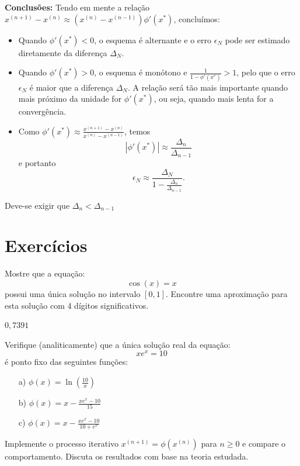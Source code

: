 \documentclass[main.tex]{subfiles}
\begin{document}
{\bf Conclusões:} Tendo em mente a relação $x^{(n+1)}-x^{(n)}  \approx (x^{(n)}-x^{(n-1)}) \phi'(x^*)$, concluímos:
\begin{itemize}
\item Quando $\phi'(x^*)<0$, o esquema é alternante e o erro $\epsilon_N$ pode ser estimado diretamente da diferença $\Delta_N$.
\item Quando $\phi'(x^*)>0$, o esquema é monótono e $\frac{1}{1-\phi'(x^*)}>1$, pelo que o erro $\epsilon_N$ é maior que a diferença $\Delta_N$. A relação será tão mais importante quando mais próximo da unidade for $\phi'(x^*)$, ou seja, quando mais lenta for a convergência.
\item Como $\phi'(x^*)\approx \frac{x^{(n+1)}-x^{(n)}}{x^{(n)}-x^{(n-1)}}$, temos
$$\left|\phi'(x^*)\right|\approx \frac{\Delta_n}{\Delta_{n-1}}$$
e portanto
$$\epsilon_N \approx \frac{\Delta_N}{1-\frac{\Delta_n}{\Delta_{n-1}}}.$$
\end{itemize}

\begin{obs}
  Deve-se exigir que $\Delta_n<\Delta_{n-1}$
\end{obs}

\section*{Exercícios}

\begin{Exercise}  Mostre que a equação:
  \begin{equation*}
    \cos(x)=x  
  \end{equation*}
possui uma única solução no intervalo $[0, 1]$. Encontre uma aproximação para esta solução com  4 dígitos significativos.
\end{Exercise}
\begin{Answer}
  \begin{tiny}
    $0,7391$
  \end{tiny}
\end{Answer}

\begin{Exercise} Verifique (analiticamente) que a única solução real da equação:
  \begin{equation*}
    xe^x=10
  \end{equation*}
é ponto fixo das seguintes funções:
\begin{itemize}
\item[a)] $\phi(x)=\ln\left(\frac{10}{x}\right)$
\item[b)] $\phi(x)=x-\frac{xe^{x}-10}{15}$
\item[c)] $\phi(x)=x-\frac{xe^{x}-10}{10+e^{x}}$
\end{itemize}
Implemente o processo iterativo $x^{(n+1)}=\phi(x^{(n)})$ para $n\geq 0$ e compare o comportamento. Discuta os resultados com base na teoria estudada.
\end{Exercise}
\end{document}
